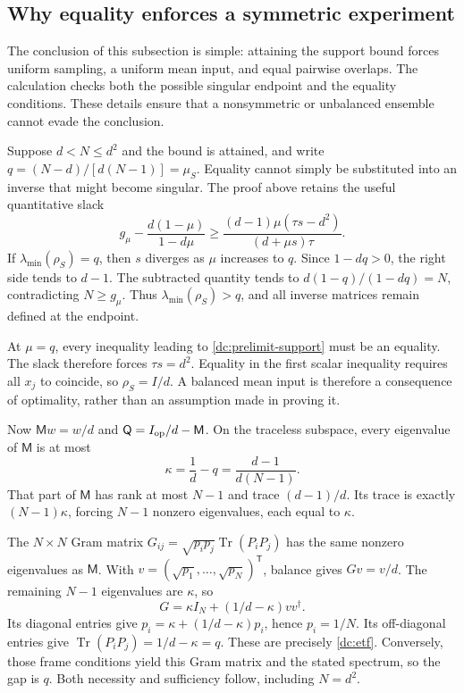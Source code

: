 \documentclass[11pt,a4paper]{article}
\newcommand{\Tr}{\operatorname{Tr}}
\numberwithin{equation}{section}
\begin{document}
\subsection{Why equality enforces a symmetric experiment}

\label{dc:equality}
The conclusion of this subsection is simple: attaining the support bound
forces uniform sampling, a uniform mean input, and equal pairwise overlaps.
The calculation checks both the possible singular endpoint and the equality
conditions. These details ensure that a nonsymmetric or unbalanced ensemble
cannot evade the conclusion.

Suppose $d<N\leq d^2$ and the bound is attained, and write
$q=(N-d)/[d(N-1)]=\mu_S$.  Equality cannot simply be substituted into
an inverse that might become singular.  The proof above retains the useful
quantitative slack
\[
 g_\mu-\frac{d(1-\mu)}{1-d\mu}
 \geq\frac{(d-1)\mu(\tau s-d^2)}{(d+\mu s)\tau}.
\]
If $\lambda_{\min}(\rho_S)=q$, then $s$ diverges as $\mu$ increases to
$q$.  Since $1-dq>0$, the right side tends to $d-1$.  The subtracted
quantity tends to $d(1-q)/(1-dq)=N$, contradicting $N\geq g_\mu$.
Thus $\lambda_{\min}(\rho_S)>q$, and all inverse matrices remain defined
at the endpoint.

At $\mu=q$, every inequality leading to
\eqref{dc:prelimit-support} must be an equality.  The slack therefore forces
$\tau s=d^2$.  Equality in the first scalar inequality requires all $x_j$
to coincide, so $\rho_S=I/d$.  A balanced mean input is therefore a
consequence of optimality, rather than an assumption made in proving it.

Now $\mathsf M w=w/d$ and $\mathsf Q=I_{\rm op}/d-\mathsf M$.
On the traceless subspace, every eigenvalue of $\mathsf M$ is at most
\[
 \kappa=\frac1d-q=\frac{d-1}{d(N-1)}.
\]
That part of $\mathsf M$ has rank at most $N-1$ and trace $(d-1)/d$.
Its trace is exactly $(N-1)\kappa$, forcing $N-1$ nonzero eigenvalues,
each equal to $\kappa$.

The $N\times N$ Gram matrix
$G_{ij}=\sqrt{p_ip_j}\Tr(P_iP_j)$ has the same nonzero eigenvalues as
$\mathsf M$.  With $v=(\sqrt{p_1},\ldots,\sqrt{p_N})^{\mathsf T}$,
balance gives $Gv=v/d$.  The remaining $N-1$ eigenvalues are
$\kappa$, so
\[
 G=\kappa I_N+(1/d-\kappa)vv^\dagger.
\]
Its diagonal entries give
$p_i=\kappa+(1/d-\kappa)p_i$, hence $p_i=1/N$.  Its off-diagonal
entries give $\Tr(P_iP_j)=1/d-\kappa=q$.  These are precisely
\eqref{dc:etf}.  Conversely, those frame conditions yield this Gram matrix
and the stated spectrum, so the gap is $q$.  Both necessity and sufficiency
follow, including $N=d^2$.
\end{document}
